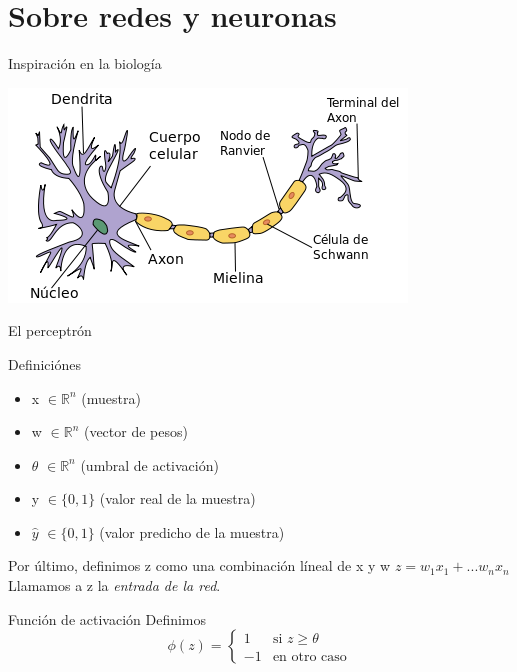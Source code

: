 \documentclass[presentation]{beamer}
\begin{document}
\section{Sobre redes y neuronas}
\label{sec:org893ada1}
\begin{frame}[label={sec:org11e3f0a}]{Inspiración en la biología}
\begin{center}
\includegraphics[width=.9\linewidth]{images/neurona.png}
\end{center}
\end{frame}

\begin{frame}[label={sec:orgb2cd66f}]{El perceptrón}
\begin{block}{Definiciónes}
\begin{itemize}
\item \alert{x} \(\in \mathbb{R}^n\) (muestra)
\item \alert{w} \(\in \mathbb{R}^n\) (vector de pesos)
\item \alert{\(\theta\)} \(\in \mathbb{R}^n\) (umbral de activación)
\item \alert{y} \(\in \{0, 1\}\) (valor real de la muestra)
\item \alert{\(\hat y\)} \(\in \{0, 1\}\) (valor predicho de la muestra)
\end{itemize}
Por último, definimos \alert{z} como una combinación líneal de \alert{x} y \alert{w}
\(z=w_1x_1+...w_nx_n\) \\
Llamamos a \alert{z} la \emph{entrada de la red}.
\pause
\end{block}
\begin{block}{Función de activación}
Definimos
\begin{equation*}
\phi(z)= \left\{ \begin{array} {rl} 1 & \text{si } z \geq \theta
\\ -1 & \text{en otro caso} \end{array} \right.
\end{equation*}
\end{block}
\end{frame}
\end{document}
